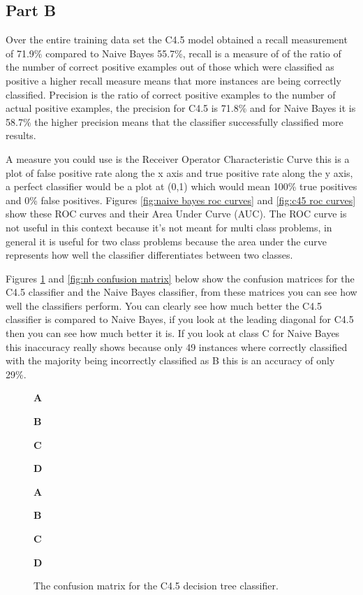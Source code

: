 \documentclass[10pt]{article}
\newcommand\MyBox[1]{%
  \fbox{\parbox[c][.7cm][c]{.7cm}{\centering #1}}%
}
\newcommand\MyVBox[1]{%
  \parbox[c][.7cm][c]{1cm}{\centering\bfseries #1}%
}
\newcommand\MyHBox[2][\dimexpr.7cm+2\fboxsep\relax]{%
  \parbox[c][1cm][c]{#1}{\centering\bfseries #2}%
}
\newcommand\MyTBox[2]{%
  \MyVBox{#1}
  \renewcommand*\do[1]{\MyBox{##1}\hspace*{-\fboxrule}}
  \docsvlist{#2}
  \par\vspace{-\fboxrule}
}
\begin{document}
\newpage
\subsection*{Part B}
Over the entire training data set the C4.5 model obtained a recall measurement of 71.9\% compared to Naive Bayes 55.7\%, recall is a measure of of the ratio of the number of correct positive examples out of those which were classified as positive\cite{MarslandStephen2015Ml:a} a higher recall measure means that more instances are being correctly classified. Precision is the ratio of correct positive examples to the number of actual positive examples\cite{MarslandStephen2015Ml:a}, the precision for C4.5 is 71.8\% and for Naive Bayes it is 58.7\% the higher precision means that the classifier successfully classified more results. 

A measure you could use is the Receiver Operator Characteristic Curve this is a plot of false positive rate along the x axis and true positive rate along the y axis, a perfect classifier would be a plot at (0,1) which would mean 100\% true positives and 0\% false positives. Figures \ref{fig:naive bayes roc curves} and \ref{fig:c45 roc curves} show these ROC curves and their Area Under Curve (AUC). The ROC curve is not useful in this context because it's not meant for multi class problems, in general it is useful for two class problems because the area under the curve represents how well the classifier differentiates between two classes.

Figures \ref{fig:j48 confusion matrix} and \ref{fig:nb confusion matrix} below show the confusion matrices for the C4.5 classifier and the Naive Bayes classifier, from these matrices you can see how well the classifiers perform. You can clearly see how much better the C4.5 classifier is compared to Naive Bayes, if you look at the leading diagonal for C4.5 then you can see how much better it is. If you look at class C for Naive Bayes this inaccuracy really shows because only 49 instances where correctly classified with the majority being incorrectly classified as B this is an accuracy of only 29\%. 

\begin{figure}[h]
    \centering
    {
    \offinterlineskip
    \hspace*{1cm}\MyHBox{A}\MyHBox{B}\MyHBox{C}
    \MyHBox{D}\par
    
    \MyTBox{A}{107, 20, 11, 14}
    \MyTBox{B}{23, 103, 20, 13}
    \MyTBox{C}{13,  24, 110,  21}
    \MyTBox{D}{9,  11,  11, 167}
    }
    \caption{The confusion matrix for the C4.5 decision tree classifier.}
    \label{fig:j48 confusion matrix}
\end{figure}
\end{document}
